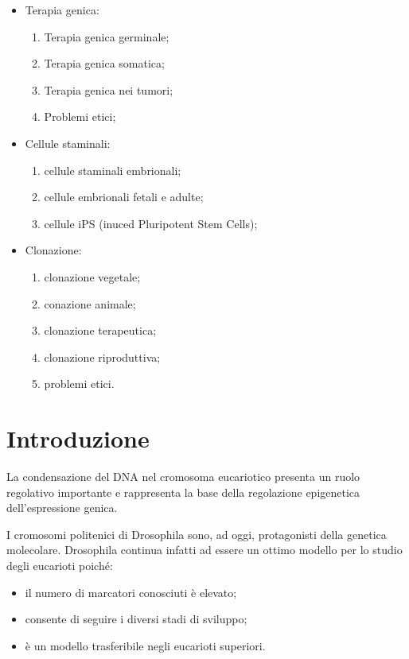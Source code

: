 \documentclass[11pt]{book}
\begin{document}
\begin{itemize}
\item
Terapia genica:

	\begin{enumerate}
    \item
    Terapia genica germinale;
    \item
    Terapia genica somatica;
    \item
    Terapia genica nei tumori;
    \item
    Problemi etici;
    \end{enumerate}

\item
Cellule staminali:

	\begin{enumerate}
    \item
    cellule staminali embrionali;
    \item
    cellule embrionali fetali e adulte;
    \item
    cellule iPS (inuced Pluripotent Stem Cells);
    \end{enumerate}
    
\item
Clonazione:

	\begin{enumerate}
    \item
    clonazione vegetale;
    \item
    conazione animale;
    \item
    clonazione terapeutica;
    \item
    clonazione riproduttiva;
    \item
    problemi etici.
    \end{enumerate}
\end{itemize}

\chapter{Introduzione}

La condensazione del DNA nel cromosoma eucariotico presenta un ruolo regolativo importante e rappresenta la base della regolazione epigenetica dell’espressione genica.

I cromosomi politenici di Drosophila sono, ad oggi, protagonisti della genetica molecolare. Drosophila continua infatti ad essere un ottimo modello per lo studio degli eucarioti poiché:
\begin{itemize}
\item
il numero di marcatori conosciuti è elevato;
\item
consente di seguire i diversi stadi di sviluppo;
\item
è un modello trasferibile negli eucarioti superiori.
\end{itemize} 
\end{document}
